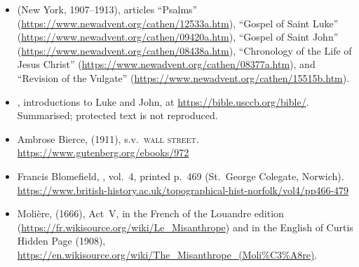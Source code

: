 \begin{itemize}[leftmargin=1.2em, itemsep=0.15em]
\item {} (New York, 1907--1913), articles
``Psalms'' (\url{https://www.newadvent.org/cathen/12533a.htm}), ``Gospel of
Saint Luke'' (\url{https://www.newadvent.org/cathen/09420a.htm}), ``Gospel of
Saint John'' (\url{https://www.newadvent.org/cathen/08438a.htm}), ``Chronology
of the Life of Jesus Christ'' (\url{https://www.newadvent.org/cathen/08377a.htm}),
and ``Revision of the Vulgate'' (\url{https://www.newadvent.org/cathen/15515b.htm}).
\item {}, introductions to Luke and
John, at \url{https://bible.usccb.org/bible/}. Summarised; protected text is
not reproduced.
\item Ambrose Bierce,  (1911), s.v.\ \textsc{wall
street}. \url{https://www.gutenberg.org/ebooks/972}
\item Francis Blomefield, , vol.~4, printed p.~469 (St.\ George Colegate,
Norwich). \url{https://www.british-history.ac.uk/topographical-hist-norfolk/vol4/pp466-479}
\item Molière,  (1666), Act~V, in the French of the
Louandre edition (\url{https://fr.wikisource.org/wiki/Le_Misanthrope}) and in
the English of Curtis Hidden Page (1908),
\url{https://en.wikisource.org/wiki/The_Misanthrope_(Moli\%C3\%A8re)}.
\end{itemize}
